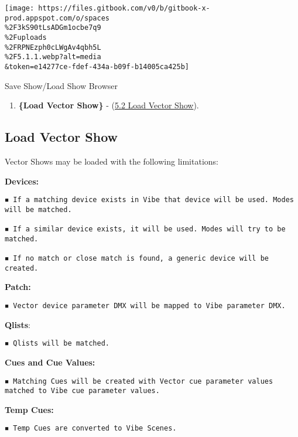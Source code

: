 \documentclass[
]{article}
\providecommand{\tightlist}{%
  \setlength{\itemsep}{0pt}\setlength{\parskip}{0pt}}
\begin{document}
\texttt{[image: https://files.gitbook.com/v0/b/gitbook-x-prod.appspot.com/o/spaces\\\%2F3kS90tLsADGm1ocbe7q9\\\%2Fuploads\\\%2FRPNEzph0cLWgAv4qbh5L\\\%2F5.1.1.webp?alt=media\\\&token=e14277ce-fdef-434a-b09f-b14005ca425b]}

Save Show/Load Show Browser

\begin{enumerate}
\def\labelenumi{\arabic{enumi}.}
\setcounter{enumi}{4}
\tightlist
\item
  \textbf{\{Load Vector Show\}} - (\href{https://vibemanual.compulite.com/file-management.html\#load-vector-show}{5.2 Load Vector Show}).
\end{enumerate}

\hypertarget{load-vector-show}{%
\subsection{Load Vector Show}\label{load-vector-show}}

Vector Shows may be loaded with the following limitations:

\textbf{Devices:}

\begin{verbatim}
◾ If a matching device exists in Vibe that device will be used. Modes will be matched. 

◾ If a similar device exists, it will be used. Modes will try to be matched. 

◾ If no match or close match is found, a generic device will be created.
\end{verbatim}

\textbf{Patch:}

\begin{verbatim}
◾ Vector device parameter DMX will be mapped to Vibe parameter DMX.
\end{verbatim}

\textbf{Qlists}:

\begin{verbatim}
◾ Qlists will be matched.
\end{verbatim}

\textbf{Cues and Cue Values:}

\begin{verbatim}
◾ Matching Cues will be created with Vector cue parameter values matched to Vibe cue parameter values.
\end{verbatim}

\textbf{Temp Cues:}

\begin{verbatim}
◾ Temp Cues are converted to Vibe Scenes.
\end{verbatim}
\end{document}
